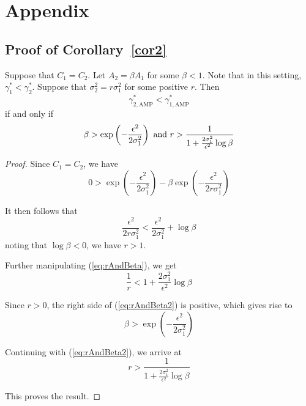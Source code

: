 \documentclass[final]{cvpr}
\newenvironment{innercor}[1]
  {\renewcommand\theinnercustomcor{#1}\innercustomcor}
  {\endinnercustomcor}
\begin{document}
{\small


}

\clearpage

\section*{Appendix}

\renewcommand{\thesubsection}{\Alph{subsection}}

\subsection{Proof of Corollary~\ref{cor2}}\label{app:a}

\begin{innercor}{2}
Suppose that $C_1=C_2$. Let $A_2=\beta A_1$ for some $\beta<1$. Note that in this setting, $\gamma^\ast_1<\gamma^\ast_2$. Suppose that $\sigma_2^2=r\sigma^2_1$ for some positive $r$. Then 
\begin{equation*}
\gamma^\ast_{2,\mathrm{AMP}}<\gamma^\ast_{1,\mathrm{AMP}}
\end{equation*}
if and only if
\begin{equation*}
\beta > \exp\left(-\frac{\epsilon^2}{2\sigma^2_1}\right) ~ {\rm and} ~
r > \frac{1}{1+\frac{2\sigma_1^2}{\epsilon^2}\log\beta}
\end{equation*}
\end{innercor}

\begin{proof}
Since $C_1=C_2$, we have 
\begin{equation*}
0 > \exp\left(-\frac{\epsilon^2}{2\sigma_1^2}\right)
- \beta\exp\left(-\frac{\epsilon^2}{2r\sigma_1^2}\right)
\end{equation*}

It then follows that
\begin{equation}\label{eq:rAndBeta}
\frac{\epsilon^2}{2r\sigma_1^2}<\frac{\epsilon^2}{2\sigma_1^2}+\log\beta
\end{equation}
noting that $\log\beta<0$, we have $r>1$.  

Further manipulating (\ref{eq:rAndBeta}), we get
\begin{equation}\label{eq:rAndBeta2}
\frac{1}{r}<1+\frac{2\sigma_1^2}{\epsilon^2}\log\beta
\end{equation}

Since $r>0$, the right side of (\ref{eq:rAndBeta2}) is positive, which gives rise to 
\begin{equation*}
\beta>\exp\left(-\frac{\epsilon^2}{2\sigma^2_1}\right)
\end{equation*}

Continuing with (\ref{eq:rAndBeta2}), we arrive at
\begin{equation*}
r>\frac{1}{1+\frac{2\sigma_1^2}{\epsilon^2}\log\beta}
\end{equation*}

This proves the result.
\end{proof}
\end{document}

